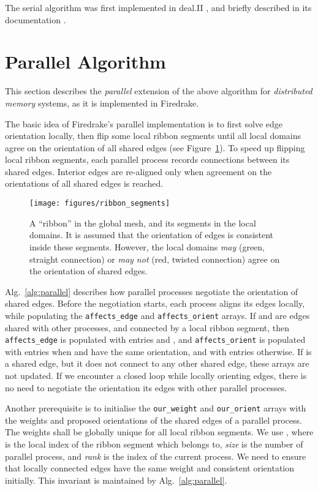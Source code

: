 \documentclass[oneeqnum,onethmnum,onefignum,onetabnum]{siamltex1213}
\begin{document}
The serial algorithm was first implemented in deal.II
\cite{Bangerth2007}, and briefly described in its
documentation \cite{Bangerth}.

\section{Parallel Algorithm}
\label{sec:parallel}

This section describes the \emph{parallel} extension of the above
algorithm for \emph{distributed memory} systems, as it is
implemented in Firedrake.

The basic idea of Firedrake's parallel implementation is to first
solve edge orientation locally, then flip some local ribbon segments
until all local domains agree on the orientation of all shared edges
(see Figure~\ref{fig:ribbon_segments}).
To speed up flipping local ribbon segments, each parallel process
records connections between its shared edges. Interior edges are
re-aligned only when agreement on the orientations of all shared
edges is reached.

\begin{figure}
  \centering
  \texttt{[image: figures/ribbon\_segments]}

  \caption{A ``ribbon'' in the global mesh, and its segments in the
    local domains. It is assumed that the orientation of edges is
    consistent inside these segments. However, the local domains
    \emph{may} (green, straight connection) or \emph{may not}
    (red, twisted connection) agree on the
    orientation of shared edges.}
  \label{fig:ribbon_segments}
\end{figure}

Alg.~\ref{alg:parallel} describes how parallel processes negotiate the
orientation of shared edges. Before the negotiation starts, each
process aligns its edges locally, while populating the
\texttt{affects\_edge} and \texttt{affects\_orient} arrays.  If 
and  are edges shared with other processes, and connected by a
local ribbon segment, then \texttt{affects\_edge} is populated with
entries  and , and \texttt{affects\_orient} is
populated with entries  when  and  have
the same orientation, and with entries  otherwise. If  is a
shared edge, but it does not connect to any other shared edge, these
arrays are not updated. If we encounter a closed loop while locally
orienting edges, there is no need to negotiate the orientation its
edges with other parallel processes.

Another prerequisite is to initialise the \texttt{our\_weight} and
\texttt{our\_orient} arrays with the weights and proposed orientations
of the shared edges of a parallel process. The weights shall be
globally unique for all local ribbon segments. We use ,
where  is the local index of the ribbon segment which 
belongs to, \textit{size} is the number of parallel process, and
\textit{rank} is the index of the current process. We need to ensure
that locally connected edges have the same weight and consistent
orientation initially. This invariant is maintained by
Alg.~\ref{alg:parallel}.
\end{document}
